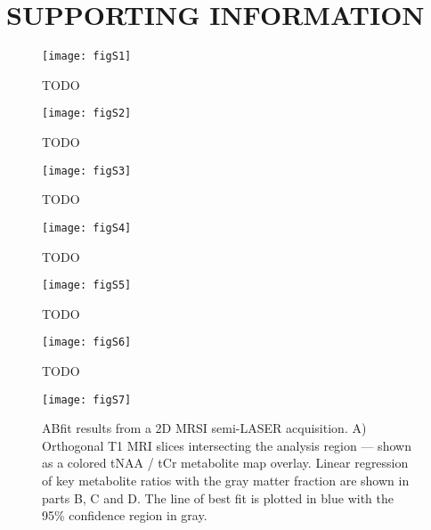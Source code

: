 \documentclass[num-refs]{wiley-article}
\begin{document}
\section*{SUPPORTING INFORMATION}

\begin{figure}[H]
  \begin{center}
    \texttt{[image: figS1]}
    \caption{TODO}
  \end{center}
\end{figure}

\begin{figure}
  \begin{center}
    \texttt{[image: figS2]}
    \caption{TODO}
  \end{center}
\end{figure}

\begin{figure}
  \begin{center}
    \texttt{[image: figS3]}
    \caption{TODO}
  \end{center}
\end{figure}

\begin{figure}
  \begin{center}
    \texttt{[image: figS4]}
    \caption{TODO}
  \end{center}
\end{figure}

\begin{figure}
  \begin{center}
    \texttt{[image: figS5]}
    \caption{TODO}
  \end{center}
\end{figure}

\begin{figure}
  \begin{center}
    \texttt{[image: figS6]}
    \caption{TODO}
  \end{center}
\end{figure}

\begin{figure}
  \begin{center}
    \texttt{[image: figS7]}
    \caption{ABfit results from a 2D MRSI semi-LASER acquisition. A) Orthogonal T1 MRI slices intersecting the analysis region --- shown as a colored tNAA / tCr metabolite map overlay. Linear regression of key metabolite ratios with the gray matter fraction are shown in parts B, C and D. The line of best fit is plotted in blue with the 95\% confidence region in gray.}
    \label{mrsi_res}
  \end{center}
\end{figure}
\end{document}
